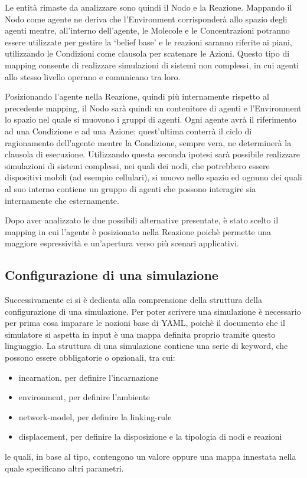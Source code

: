 Le entità rimaste da analizzare sono quindi il Nodo e la Reazione. Mappando il Nodo come agente ne deriva che l'Environment corrisponderà allo spazio degli agenti mentre, all'interno dell'agente, le Molecole e le Concentrazioni potranno essere utilizzate per gestire la `belief base' e le reazioni saranno riferite ai piani, utilizzando le Condizioni come clausola per scatenare le Azioni. Questo tipo di mapping consente di realizzare simulazioni di sistemi non complessi, in cui agenti allo stesso livello operano e comunicano tra loro.

Posizionando l'agente nella Reazione, quindi più internamente rispetto al precedente mapping, il Nodo sarà quindi un contenitore di agenti e l'Environment lo spazio nel quale si muovono i gruppi di agenti. Ogni agente avrà il riferimento ad una Condizione e ad una Azione: quest'ultima conterrà il ciclo di ragionamento dell'agente mentre la Condizione, sempre vera, ne determinerà la clausola di esecuzione. Utilizzando questa seconda ipotesi sarà possibile realizzare simulazioni di sistemi complessi, nei quali dei nodi, che potrebbero essere dispositivi mobili (ad esempio cellulari), si muovo nello spazio ed ognuno dei quali al suo interno contiene un gruppo di agenti che possono interagire sia internamente che esternamente.

Dopo aver analizzato le due possibili alternative presentate, è stato scelto il mapping in cui l'agente è posizionato nella Reazione poichè permette una maggiore espressività e un'apertura verso più scenari applicativi.

\subsection{Configurazione di una simulazione}
Successivamente ci si è dedicata alla comprensione della struttura della configurazione di una simulazione. Per poter scrivere una simulazione è necessario per prima cosa imparare le nozioni base di YAML, poichè il documento che il simulatore si aspetta in input è una mappa definita proprio tramite questo linguaggio.
La struttura di una simulazione contiene una serie di keyword, che possono essere obbligatorie o opzionali, tra cui:
\begin{itemize}
\item incarnation, per definire l'incarnazione
\item environment, per definire l'ambiente
\item network-model, per definire la linking-rule
\item displacement, per definire la disposizione e la tipologia di nodi e reazioni
\end{itemize}
le quali, in base al tipo, contengono un valore oppure una mappa innestata nella quale specificano altri parametri.

